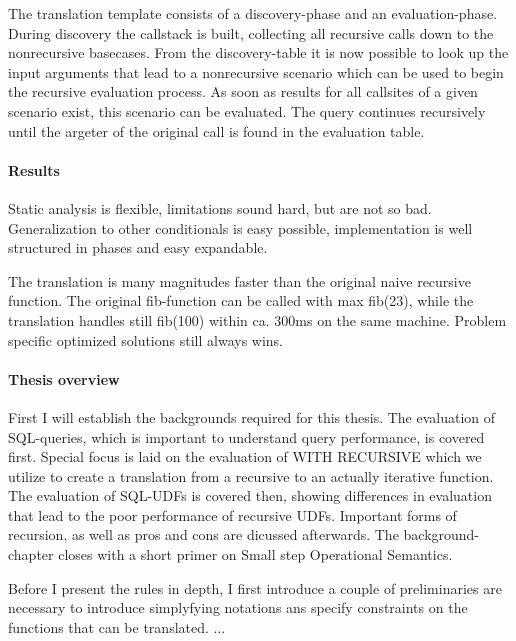 The translation template consists of a discovery-phase and an evaluation-phase. During discovery the callstack is built, collecting all recursive calls down to the nonrecursive basecases. From the discovery-table it is now possible to look up the input arguments that lead to a nonrecursive scenario which can be used to begin the recursive evaluation process. As soon as results for all callsites of a given scenario exist, this scenario can be evaluated. The query continues recursively until the argeter of the original call is found in the evaluation table.
    

\paragraph*{Results}
Static analysis is flexible, limitations sound hard, but are not so bad. Generalization to other conditionals is easy possible, implementation is well structured in phases and easy expandable.

The translation is many magnitudes faster than the original naive recursive function. The original fib-function can be called with max fib(23), while the translation handles still fib(100) within ca. 300ms on the same machine. Problem specific optimized solutions still always wins.

\paragraph*{Thesis overview}
First I will establish the backgrounds required for this thesis. The evaluation of SQL-queries, which is important to understand query performance, is covered first. Special focus is laid on the evaluation of WITH RECURSIVE which we utilize to create a translation from a recursive to an actually iterative function. The evaluation of SQL-UDFs is covered then, showing differences in evaluation that lead to the poor performance of recursive UDFs. Important forms of recursion, as well as pros and cons are dicussed afterwards. The background-chapter closes with a short primer on Small step Operational Semantics.

Before I present the rules in depth, I first introduce a couple of preliminaries are necessary to introduce simplyfying notations ans specify constraints on the functions that can be translated.
...